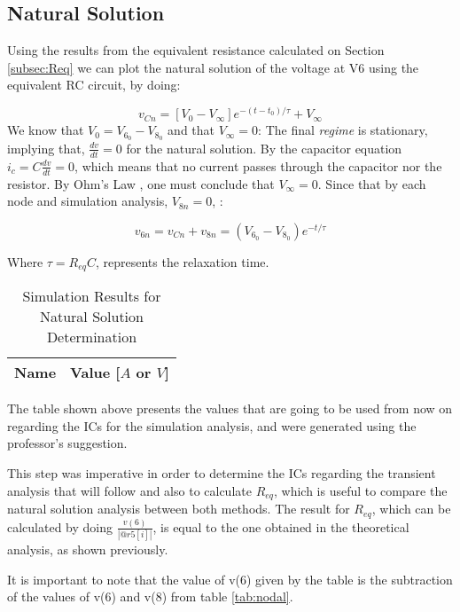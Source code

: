 \subsection{Natural Solution}

Using the results from the equivalent resistance calculated on Section \ref{subsec:Req} we can plot the natural solution of the voltage at V6 using the equivalent RC circuit, by doing:

\begin{equation}
    v_{Cn}=[V_0-V_{\infty}]e^{-(t-t_0)/\tau} + V_{\infty} \nonumber
\end{equation}
We know that $V_0=V_{6_0}-V_{8_0}$ and that $V_{\infty} = 0$: The final \textit{regime} is stationary, implying that, $\frac{dv}{dt} = 0$  for the natural solution. By the capacitor equation $i_c=C\frac{dv}{dt}=0$, which means that no current passes through the capacitor nor the resistor. By Ohm's Law , one must conclude that $V_{\infty}=0$. Since that by each node and simulation analysis, $V_{8n}=0$, :

\begin{equation}
    v_{6n} = v_{Cn}+v_{8n} = (V_{6_0}-V_{8_0})e^{-t/\tau} \nonumber
\end{equation}

Where $\tau= R_{eq}C$, represents the relaxation time.

\begin{table}[h]
    \centering
    \begin{tabular}{|l|c|}
    \hline
    {\bf Name} & {\bf Value [$A$ or $V$]} \\ \hline
    
    \end{tabular}
    \caption{Simulation Results for Natural Solution Determination}
    \label{tab:ngspice1}
\end{table}

The table shown above presents the values that are going to be used from now on regarding the ICs for the simulation analysis, and were generated using the professor's suggestion.

This step was imperative in order to determine the ICs regarding the transient analysis that will follow and also to calculate $R_{eq}$, which is useful to compare the natural solution analysis between both methods. The result for $R_{eq}$, which can be calculated by doing $\frac{v(6)}{|@r5[i]|}$, is equal to the one obtained in the theoretical analysis, as shown previously.

It is important to note that the value of v(6) given by the table is the subtraction of the values of v(6) and v(8) from table \ref{tab:nodal}.\\

